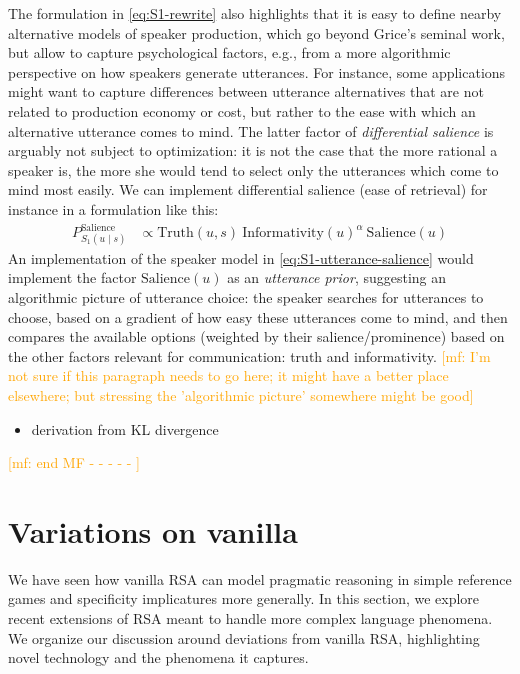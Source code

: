 \documentclass{sp}
\newcommand{\mf}[1]{\textcolor{orange}{[mf: #1]}}
\begin{document}
The formulation in \eqref{eq:S1-rewrite} also highlights that it is easy to define nearby
alternative models of speaker production, which go beyond Grice's seminal work, but allow to
capture psychological factors, e.g., from a more algorithmic perspective on how speakers
generate utterances. For instance, some applications might want to capture differences between
utterance alternatives that are not related to production economy or cost, but rather to the
ease with which an alternative utterance comes to mind. The latter factor of \emph{differential
  salience} is arguably not subject to optimization: it is not the case that the more rational
a speaker is, the more she would tend to select only the utterances which come to mind most
easily. We can implement differential salience (ease of retrieval) for instance in a
formulation like this:
%
\begin{align}
  \label{eq:S1-utterance-salience}
  P_{S_1(u\mid s)}^{\text{Salience}}   & \propto \text{Truth}(u,s) \ \text{Informativity}(u)^{\alpha} \ \text{Salience}(u)
\end{align}
An implementation of the speaker model in \eqref{eq:S1-utterance-salience} would implement the
factor $\text{Salience}(u)$ as an \emph{utterance prior}, suggesting an algorithmic
picture of utterance choice: the speaker searches for utterances to choose, based on a gradient
of how easy these utterances come to mind, and then compares the available options (weighted by
their salience/prominence) based on the other factors relevant for communication: truth and
informativity. \mf{I'm not sure if this paragraph needs to go here; it might have a better
  place elsewhere; but stressing the 'algorithmic picture' somewhere might be good}



\begin{itemize}
\item derivation from KL divergence
\end{itemize}

\mf{end MF - - - - - }

\section{Variations on vanilla} \label{variations}

We have seen how vanilla RSA can model pragmatic reasoning in simple reference games and specificity implicatures more generally. In this section, we explore recent extensions of RSA meant to handle more complex language phenomena. We organize our discussion around deviations from vanilla RSA, highlighting novel technology and the phenomena it captures.
\end{document}
